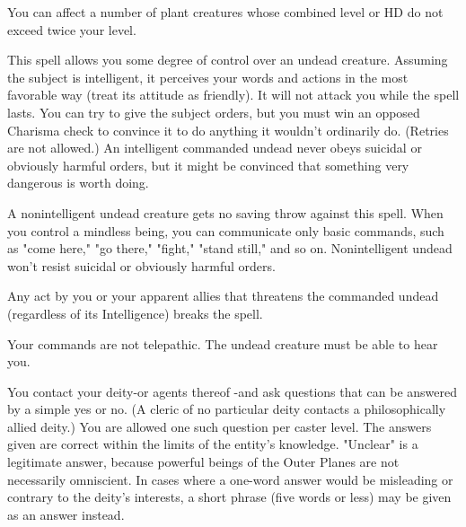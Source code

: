 \begin{multicols}{2}
\begin{small}
\smallskip\noindent You can affect a number of plant creatures whose combined level or HD do not exceed twice your level.

\noindent This spell allows you some degree of control over an undead creature. Assuming the subject is intelligent, it perceives your words and actions in the most favorable way (treat its attitude as friendly). It will not attack you while the spell lasts. You can try to give the subject orders, but you must win an opposed Charisma check to convince it to do anything it wouldn't ordinarily do. (Retries are not allowed.) An intelligent commanded undead never obeys suicidal or obviously harmful orders, but it might be convinced that something very dangerous is worth doing.

\smallskip\noindent A nonintelligent undead creature gets no saving throw against this spell. When you control a mindless being, you can communicate only basic commands, such as "come here," "go there," "fight," "stand still," and so on. Nonintelligent undead won't resist suicidal or obviously harmful orders.

\smallskip\noindent Any act by you or your apparent allies that threatens the commanded undead (regardless of its Intelligence) breaks the spell.

\smallskip\noindent Your commands are not telepathic. The undead creature must be able to hear you.


\noindent You contact your deity-or agents thereof -and ask questions that can be answered by a simple yes or no. (A cleric of no particular deity contacts a philosophically allied deity.) You are allowed one such question per caster level. The answers given are correct within the limits of the entity's knowledge. "Unclear" is a legitimate answer, because powerful beings of the Outer Planes are not necessarily omniscient. In cases where a one-word answer would be misleading or contrary to the deity's interests, a short phrase (five words or less) may be given as an answer instead.


\end{small}
\end{multicols}
